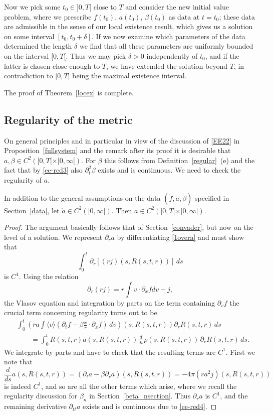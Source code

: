 \documentclass[11pt]{article}
\def\p0{\langle v \rangle}
\begin{document}
Now we pick some $t_0 \in ]0,T[$ close to $T$ and consider the new initial value
problem, where we prescribe $f(t_0)$, $a(t_0)$, $\beta(t_0)$ as data at $t=t_0$;
these data are admissible in the sense of our local existence result,
which gives us a solution on some interval $[t_0,t_0+\delta]$.
If we now examine which parameters of the data determined the length $\delta$
we find that all these parameters are uniformly bounded on the interval $[0,T[$.
Thus we may pick $\delta>0$ independently of $t_0$, and if the latter is chosen
close enough to $T$, we have extended the solution beyond $T$,
in contradiction to     $[0,T[$ being the maximal existence interval.

The proof of Theorem~\ref{locex} is complete.
%
%
\subsection{Regularity of the metric}\label{regmetric}
%
%
On general principles and in particular in view of the discussion
of \eqref{EE22}
in Proposition~\ref{fullsystem} and the remark after its proof it
is desirable that
$a, \beta \in C^2([0,T[\times [0,\infty[)$. For $\beta$ this follows from
Definition~\ref{regular}~(e) and the fact that by \eqref{ee-red3} also
$\partial^2_t \beta$ exists and is continuous. We need to check the
regularity of $a$.
%
\begin{cor}\label{corareg}
  In addition to the general assumptions on the data
  $(\mathring{f}, \mathring{a},\mathring{\beta})$ specified
  in Section~\ref{data},
  let $\mathring{a}\in C^2([0,\infty[)$.
  Then $a\in C^2([0,T[\times [0,\infty[)$.
\end{cor}
%
\begin{proof}
  The argument basically follows that of Section~\ref{convader},
  but now on the level
  of a solution. We represent $\partial_r a$ by differentiating
  \eqref{1overa} and must show that
  \[
  \int_0^t \partial_r\left[(r j)(s,R(s,t,r))\right]\, ds
  \]
  is $C^1$. Using the relation
  \[
  \partial_r (r j) = r \int v\cdot \partial_x f dv - j,
  \]
  the Vlasov equation and integration by parts on the term
  containing $\partial_v f$
  the crucial term concerning regularity turns out to be
  \begin{align*}
    &
    \int_0^t\left(r a \int \p0
    \left(\partial_t f - \beta \frac{x}{r}\cdot\partial_x f\right)\,
    dv\right)(s,R(s,t,r)) \partial_r R(s,t,r)\, ds\\
    &\qquad =
    \int_0^t R(s,t,r) a(s, R(s,t,r)) \frac{d}{ds} \rho(s,R(s,t,r))
    \,\partial_r R(s,t,r)\, ds.
  \end{align*}
  We integrate by parts and have to check that the resulting terms are $C^1$.
  First we note that
  \[
  \frac{d}{ds} a (s,R(s,t,r))
  =\left(\partial_t a -\beta \partial_r a\right)(s,R(s,t,r))
  = -4\pi \left(r a^2 j\right)(s,R(s,t,r))
  \]
  is indeed $C^1$, and so are all the other terms which arise,
  where we recall the
  regularity discussion for $\beta_n$ in Section~\ref{beta_nsection}.
  Thus $\partial_r a$ is $C^1$, and the remaining derivative
  $\partial_{tt} a$ exists and is continuous due to \eqref{ee-red4}.
\end{proof}
%
%
\end{document}
